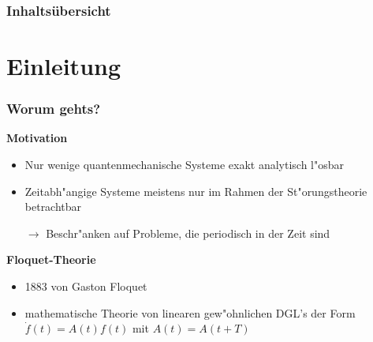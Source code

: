
\begin{frame}
\frametitle{Inhaltsübersicht}
\tableofcontents%
\end{frame}


\section{Einleitung}
\begin{frame}
  \frametitle{Worum gehts?} %
  \textbf{Motivation}
    \begin{itemize}
      \item Nur wenige quantenmechanische Systeme exakt analytisch l"osbar
      \item Zeitabh"angige Systeme meistens nur im Rahmen der St"orungstheorie betrachtbar

      $\rightarrow$ Beschr"anken auf Probleme, die periodisch in der Zeit sind
    \end{itemize}

  \textbf{Floquet-Theorie}
  \begin{itemize}
    \item 1883 von Gaston Floquet
    \item mathematische Theorie von linearen gew"ohnlichen DGL's der Form $\dot f(t)=A(t)f(t)$ mit $A(t)=A(t+T)$
  \end{itemize}




\end{frame}

